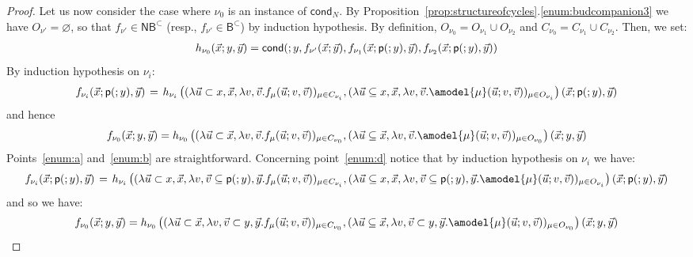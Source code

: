 \documentclass[manuscript,screen]{acmart}
\renewcommand{\emptyset}{\varnothing}
\theoremstyle{definition}
\theoremstyle{remark}
\newcommand{\permpref}{\subset}
\newcommand{\n}{N}
\newcommand{\pred}{\mathsf{p}}
\newcommand{\cnd}{\mathsf{cond}}
\newcommand{\model}[1]{\denot{#1}}
\newcommand{\denot}[1]{f_{#1}}
\newcommand{\bc}{\mathsf{B}}
\newcommand{\bcwfpo}[1]{\bc^{#1}}
\newcommand{\nested}{\mathsf{N}}
\newcommand{\nbcwfpo}[1]{\nested\bcwfpo{#1}}
\newcommand{\bcpp}{\bcwfpo{\permpref}}
\newcommand{\nbcpp}{\nbcwfpo{\permpref}}
\newcommand{\close}[1]{{C}_{#1}}
\newcommand{\open}[1]{{O}_{#1}}
\newcommand{\hnu}{\nu_0}
\begin{document}
\begin{proof}
 
Let us now consider the case where $\hnu$ is an instance of $\cnd_\n$. By Proposition~\ref{prop:structureofcycles}.\ref{enum:budcompanion3} we have $\open{\nu'}=\emptyset$, so that $\model{{\nu'}}\in \nbcpp$ (resp., $\model{{\nu'}}\in \bcpp$) by induction hypothesis.  By definition,  $\open \hnu=\open{\nu_1}\cup \open{\nu_2}$ and  $\close \hnu=\close{\nu_1}\cup \close{\nu_2}$. Then, we set:
\[
\arraycolsep=2pt
\begin{array}{c}
 h_{ \hnu}(\vec{x};y,  \vec{y})
 = 
 \cnd(;y, \model{{\nu'}}(\vec{x}; \vec{y}), \model{{\nu_1}}(\vec{x};\pred(;y), \vec{y}) , \model{{\nu_2}}( \vec{x};\pred(;y), \vec{y}))    
\end{array}
\]
By induction hypothesis on $\nu_i$:
 \[
\arraycolsep=2pt
\begin{array}{rcl}
\model{{\nu_i} }(\vec{x}; \pred(;y), \vec{y}) 
&=&
h_{\nu_i}\left(( \lambda \vec{u}\subset x,\vec{x}, \lambda v,\vec{v}. \model{{\mu}}(\vec{u};v,\vec{v}))_{\mu \in \close{\nu_i}},( \lambda \vec{u}\subseteq x,\vec{x}, \lambda v,\vec{v}. \amodel{{\mu}}(\vec{u};v,\vec{v}))_{\mu \in  \open{\nu_i}}\right)(\vec{x};\pred(;y), \vec{y})
\end{array}
\]
and   hence 
   \[
\arraycolsep=2pt
\begin{array}{c}
\model{ \hnu}( \vec{x};y, \vec{y})
=
h_{\hnu}\left((\lambda \vec{u}\subset \vec{x}, \lambda v,\vec v. \model{{\mu}}(\vec{u};v,\vec v))_{\mu \in \close{\hnu}},(\lambda \vec{u}\subseteq \vec{x}, \lambda v,\vec v. \amodel{{\mu}}(\vec{u};v,\vec v))_{\mu \in \open{\hnu}}\right)(\vec{x};y, \vec{y})
\end{array}
\]
Points~\ref{enum:a} and~\ref{enum:b} are straightforward. Concerning point~\ref{enum:d} notice that by induction hypothesis on $\nu_i$ we have:
 \[
\arraycolsep=2pt
\begin{array}{rcl}
\model{{\nu_i} }(\vec{x}; \pred(;y), \vec{y}) 
&=&
h_{\nu_i}\left(( \lambda \vec{u}\subset x,\vec{x}, \lambda v,\vec{v}\subseteq \pred(;y), \vec{y}. \model{{\mu}}(\vec{u};v,\vec{v}))_{\mu \in \close{\nu_i}},( \lambda \vec{u}\subseteq x,\vec{x}, \lambda v,\vec{v}\subseteq \pred(;y), \vec{y}. \amodel{{\mu}}(\vec{u};v,\vec{v}))_{\mu \in  \open{\nu_i}}\right)(\vec{x};\pred(;y), \vec{y})
\end{array}
\]
and so we have:
 \[
\arraycolsep=2pt
\begin{array}{c}
\model{ \hnu}( \vec{x};y, \vec{y})
=
h_{\hnu}\left((\lambda \vec{u}\subset \vec{x}, \lambda v,\vec v\subset y, \vec{y}. \model{{\mu}}(\vec{u};v,\vec v))_{\mu \in \close{\hnu}},(\lambda \vec{u}\subseteq \vec{x}, \lambda v,\vec v\subset y, \vec{y}. \amodel{{\mu}}(\vec{u};v,\vec v))_{\mu \in \open{\hnu}}\right)(\vec{x};y, \vec{y})
\end{array}
\]



\end{proof}
\end{document}
